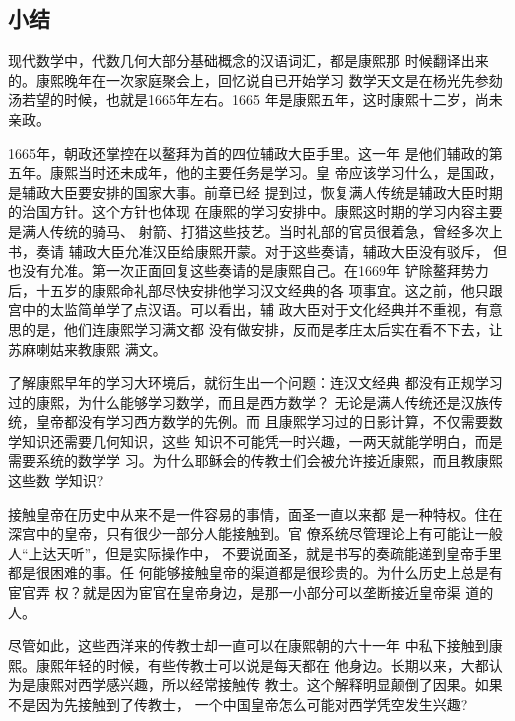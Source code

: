 \subsection{小结}
\par
现代数学中，代数几何大部分基础概念的汉语词汇，都是康熙那%
时候翻译出来的。康熙晚年在一次家庭聚会上，回忆说自已开始学习%
数学天文是在杨光先参劾汤若望的时候，也就是1665年左右。1665%
年是康熙五年，这时康熙十二岁，尚未亲政。%
\par
1665年，朝政还掌控在以鳌拜为首的四位辅政大臣手里。这一年%
是他们辅政的第五年。康熙当时还未成年，他的主要任务是学习。皇%
帝应该学习什么，是国政，是辅政大臣要安排的国家大事。前章已经%
提到过，恢复满人传统是辅政大臣时期的治国方针。这个方针也体现%
在康熙的学习安排中。康熙这时期的学习内容主要是满人传统的骑马、%
射箭、打猎这些技艺。当时礼部的官员很着急，曾经多次上书，奏请%
辅政大臣允准汉臣给康熙开蒙。对于这些奏请，辅政大臣没有驳斥，%
但也没有允准。第一次正面回复这些奏请的是康熙自己。在1669年%
铲除鳌拜势力后，十五岁的康熙命礼部尽快安排他学习汉文经典的各%
项事宜。这之前，他只跟宫中的太监简单学了点汉语。可以看出，辅%
政大臣对于文化经典并不重视，有意思的是，他们连康熙学习满文都%
没有做安排，反而是孝庄太后实在看不下去，让苏麻喇姑来教康熙%
满文。%
\par
了解康熙早年的学习大环境后，就衍生出一个问题：连汉文经典%
都没有正规学习过的康熙，为什么能够学习数学，而且是西方数学？%
无论是满人传统还是汉族传统，皇帝都没有学习西方数学的先例。而%
且康熙学习过的日影计算，不仅需要数学知识还需要几何知识，这些%
知识不可能凭一时兴趣，一两天就能学明白，而是需要系统的数学学%
习。为什么耶稣会的传教士们会被允许接近康熙，而且教康熙这些数%
学知识?%
\par
接触皇帝在历史中从来不是一件容易的事情，面圣一直以来都%
是一种特权。住在深宫中的皇帝，只有很少一部分人能接触到。官%
僚系统尽管理论上有可能让一般人“上达天听”，但是实际操作中，%
不要说面圣，就是书写的奏疏能递到皇帝手里都是很困难的事。任%
何能够接触皇帝的渠道都是很珍贵的。为什么历史上总是有宦官弄%
权？就是因为宦官在皇帝身边，是那一小部分可以垄断接近皇帝渠%
道的人。%
\par
尽管如此，这些西洋来的传教士却一直可以在康熙朝的六十一年%
中私下接触到康熙。康熙年轻的时候，有些传教士可以说是每天都在%
他身边。长期以来，大都认为是康熙对西学感兴趣，所以经常接触传%
教士。这个解释明显颠倒了因果。如果不是因为先接触到了传教士，%
一个中国皇帝怎么可能对西学凭空发生兴趣?%
\par
